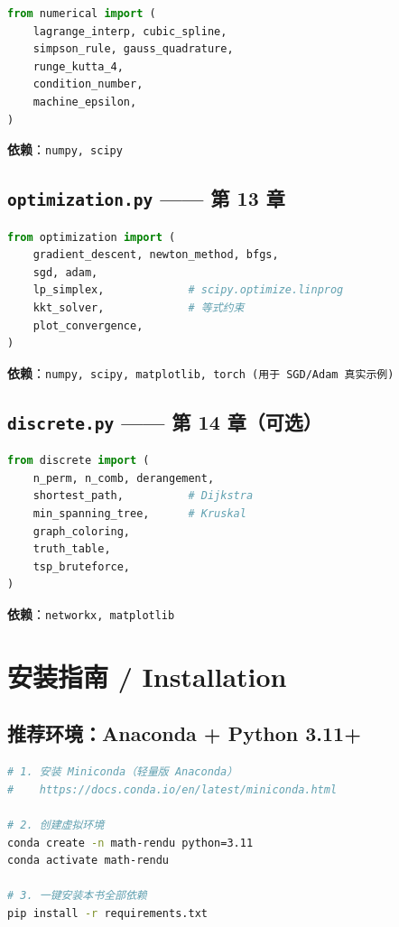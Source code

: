 \begin{lstlisting}[language=Python]
from numerical import (
    lagrange_interp, cubic_spline,
    simpson_rule, gauss_quadrature,
    runge_kutta_4,
    condition_number,
    machine_epsilon,
)
\end{lstlisting}
\textbf{依赖}：\texttt{numpy, scipy}

\subsection{\texttt{optimization.py} —— 第 13 章}

\begin{lstlisting}[language=Python]
from optimization import (
    gradient_descent, newton_method, bfgs,
    sgd, adam,
    lp_simplex,             # scipy.optimize.linprog
    kkt_solver,             # 等式约束
    plot_convergence,
)
\end{lstlisting}
\textbf{依赖}：\texttt{numpy, scipy, matplotlib, torch (用于 SGD/Adam 真实示例)}

\subsection{\texttt{discrete.py} —— 第 14 章（可选）}

\begin{lstlisting}[language=Python]
from discrete import (
    n_perm, n_comb, derangement,
    shortest_path,          # Dijkstra
    min_spanning_tree,      # Kruskal
    graph_coloring,
    truth_table,
    tsp_bruteforce,
)
\end{lstlisting}
\textbf{依赖}：\texttt{networkx, matplotlib}

\section{安装指南 / Installation}

\subsection{推荐环境：Anaconda + Python 3.11+}

\begin{lstlisting}[language=bash]
# 1. 安装 Miniconda（轻量版 Anaconda）
#    https://docs.conda.io/en/latest/miniconda.html

# 2. 创建虚拟环境
conda create -n math-rendu python=3.11
conda activate math-rendu

# 3. 一键安装本书全部依赖
pip install -r requirements.txt
\end{lstlisting}

